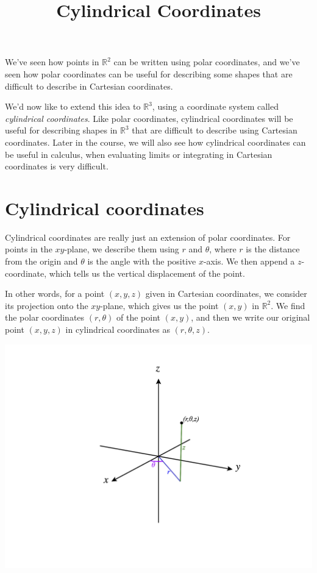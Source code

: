 \documentclass{ximera}
\title{Cylindrical Coordinates}
\begin{document}
\begin{abstract}
\end{abstract}
\maketitle

We've seen how points in $\mathbb{R}^2$ can be written using polar coordinates, and we've seen how polar coordinates can be useful for describing some shapes that are difficult to describe in Cartesian coordinates.

We'd now like to extend this idea to $\mathbb{R}^3$, using a coordinate system called \emph{cylindrical coordinates}. Like polar coordinates, cylindrical coordinates will be useful for describing shapes in $\mathbb{R}^3$ that are difficult to describe using Cartesian coordinates. Later in the course, we will also see how cylindrical coordinates can be useful in calculus, when evaluating limits or integrating in Cartesian coordinates is very difficult.

\section*{Cylindrical coordinates}

Cylindrical coordinates are really just an extension of polar coordinates. For points in the $xy$-plane, we describe them using $r$ and $\theta$, where $r$ is the distance from the origin and $\theta$ is the angle with the positive $x$-axis. We then append a $z$-coordinate, which tells us the vertical displacement of the point.

In other words, for a point $(x,y,z)$ given in Cartesian coordinates, we consider its projection onto the $xy$-plane, which gives us the point $(x,y)$ in $\mathbb{R}^2$. We find the polar coordinates $(r,\theta)$ of the point $(x,y)$, and then we write our original point $(x,y,z)$ in cylindrical coordinates as $(r,\theta, z)$.

\begin{image}
\includegraphics[width = \textwidth]{CalcPlot3D-cylindrical}
\end{image}
\end{document}
